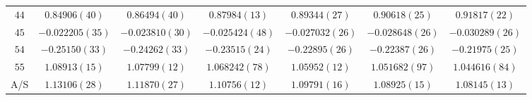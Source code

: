 \begin{table}
\begin{center}
\begin{tabular}{c|c c c c c c}
$44$ & $0.84906(40)$ & $0.86494(40)$ & $0.87984(13)$ & $0.89344(27)$ & $0.90618(25)$ & $0.91817(22)$ \\
$45$ & $-0.022205(35)$ & $-0.023810(30)$ & $-0.025424(48)$ & $-0.027032(26)$ & $-0.028648(26)$ & $-0.030289(26)$ \\
$54$ & $-0.25150(33)$ & $-0.24262(33)$ & $-0.23515(24)$ & $-0.22895(26)$ & $-0.22387(26)$ & $-0.21975(25)$ \\
$55$ & $1.08913(15)$ & $1.07799(12)$ & $1.068242(78)$ & $1.05952(12)$ & $1.051682(97)$ & $1.044616(84)$ \\
\hline
A/S & $1.13106(28)$ & $1.11870(27)$ & $1.10756(12)$ & $1.09791(16)$ & $1.08925(15)$ & $1.08145(13)$ \\
\hline
\hline
\end{tabular}
\end{center}
\end{table}
